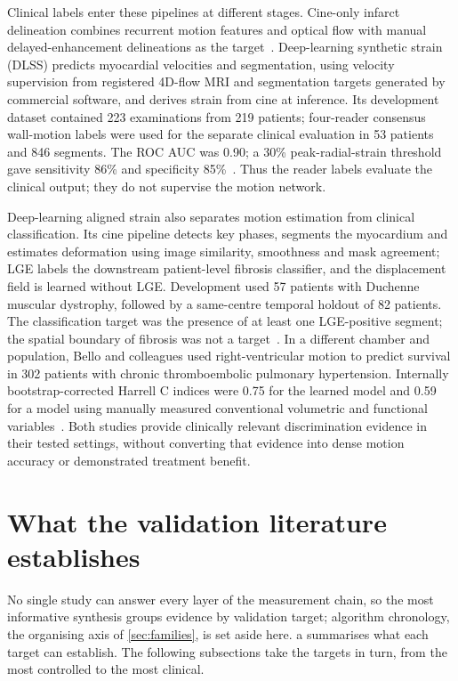 Clinical labels enter these pipelines at different stages. Cine-only infarct delineation combines recurrent motion features and optical flow with manual delayed-enhancement delineations as the target~\cite{xu2018}. Deep-learning synthetic strain (DLSS) predicts myocardial velocities and segmentation, using velocity supervision from registered 4D-flow MRI and segmentation targets generated by commercial software, and derives strain from cine at inference. Its development dataset contained 223 examinations from 219 patients; four-reader consensus wall-motion labels were used for the separate clinical evaluation in 53 patients and 846 segments. The ROC AUC was 0.90; a 30\% peak-radial-strain threshold gave sensitivity 86\% and specificity 85\%~\cite{masutani2023dlss}. Thus the reader labels evaluate the clinical output; they do not supervise the motion network.

Deep-learning aligned strain also separates motion estimation from clinical classification. Its cine pipeline detects key phases, segments the myocardium and estimates deformation using image similarity, smoothness and mask agreement; LGE labels the downstream patient-level fibrosis classifier, and the displacement field is learned without LGE. Development used 57 patients with Duchenne muscular dystrophy, followed by a same-centre temporal holdout of 82 patients. The classification target was the presence of at least one LGE-positive segment; the spatial boundary of fibrosis was not a target~\cite{koehler2025alignedstrain}. In a different chamber and population, Bello and colleagues used right-ventricular motion to predict survival in 302 patients with chronic thromboembolic pulmonary hypertension. Internally bootstrap-corrected Harrell C indices were 0.75 for the learned model and 0.59 for a model using manually measured conventional volumetric and functional variables~\cite{bello2019}. Both studies provide clinically relevant discrimination evidence in their tested settings, without converting that evidence into dense motion accuracy or demonstrated treatment benefit.



\section{What the validation literature establishes}\label{sec:validation}

No single study can answer every layer of the measurement chain, so the most informative synthesis groups evidence by validation target; algorithm chronology, the organising axis of \cref{sec:families}, is set aside here. a summarises what each target can establish. The following subsections take the targets in turn, from the most controlled to the most clinical.

